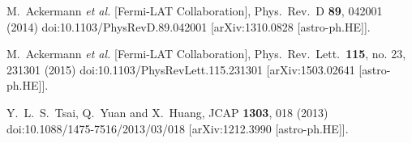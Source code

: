\documentclass[12pt,prd,showpacs,amsmath,amssymb,aps,floats,floatfix,nofootinbib]{revtex4-1}
\begin{document}
\begin{thebibliography}{99}
  M.~Ackermann {\it et al.} [Fermi-LAT Collaboration],
  Phys.\ Rev.\ D {\bf 89}, 042001 (2014)
  doi:10.1103/PhysRevD.89.042001
  [arXiv:1310.0828 [astro-ph.HE]].

  M.~Ackermann {\it et al.} [Fermi-LAT Collaboration],
  Phys.\ Rev.\ Lett.\  {\bf 115}, no. 23, 231301 (2015)
  doi:10.1103/PhysRevLett.115.231301
  [arXiv:1503.02641 [astro-ph.HE]].

  Y.~L.~S.~Tsai, Q.~Yuan and X.~Huang,
  JCAP {\bf 1303}, 018 (2013)
  doi:10.1088/1475-7516/2013/03/018
  [arXiv:1212.3990 [astro-ph.HE]].
\end{thebibliography}
\end{document}

